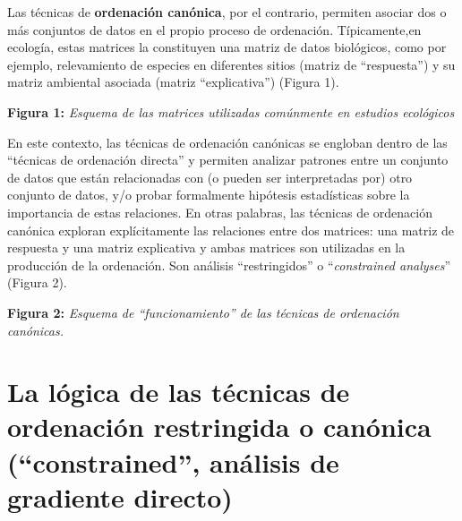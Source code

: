 \documentclass[
]{book}
\begin{document}
Las técnicas de \textbf{ordenación canónica}, por el contrario, permiten asociar dos o más conjuntos de datos en el propio proceso de ordenación. Típicamente,en ecología, estas matrices la constituyen una matriz de datos biológicos, como por ejemplo, relevamiento de especies en diferentes sitios (matriz de ``respuesta'') y su matriz ambiental asociada (matriz ``explicativa'') (Figura 1).

\textbf{Figura 1:} \emph{Esquema de las matrices utilizadas comúnmente en estudios ecológicos}

En este contexto, las técnicas de ordenación canónicas se engloban dentro de las ``técnicas de ordenación directa'' y permiten analizar patrones entre un conjunto de datos que están relacionadas con (o pueden ser interpretadas por) otro conjunto de datos, y/o probar formalmente hipótesis estadísticas sobre la importancia de estas relaciones. En otras palabras, las técnicas de ordenación canónica exploran explícitamente las relaciones entre dos matrices: una matriz de respuesta y una matriz explicativa y ambas matrices son utilizadas en la producción de la ordenación. Son análisis ``restringidos'' o ``\emph{constrained analyses}'' (Figura 2).

\textbf{Figura 2:} \emph{Esquema de ``funcionamiento'' de las técnicas de ordenación canónicas.}

\hypertarget{la-luxf3gica-de-las-tuxe9cnicas-de-ordenaciuxf3n-restringida-o-canuxf3nica-constrained-anuxe1lisis-de-gradiente-directo}{%
\section{La lógica de las técnicas de ordenación restringida o canónica (``constrained'', análisis de gradiente directo)}\label{la-luxf3gica-de-las-tuxe9cnicas-de-ordenaciuxf3n-restringida-o-canuxf3nica-constrained-anuxe1lisis-de-gradiente-directo}}
\end{document}

